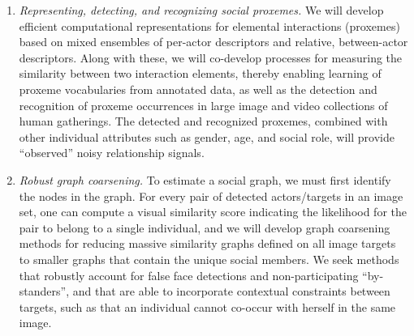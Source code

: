 \begin{enumerate}

\vspace{-0.1in}\item \emph{Representing, detecting, and recognizing social proxemes.} We will develop efficient computational representations for elemental interactions (proxemes) based on mixed ensembles of per-actor descriptors and relative, between-actor descriptors. Along with these, we will co-develop processes for measuring the similarity between two interaction elements, thereby enabling learning of proxeme vocabularies from annotated data, as well as the detection and recognition of proxeme occurrences in large image and video collections of human gatherings. The detected and recognized proxemes, combined with other individual attributes such as gender, age, and social role, will provide ``observed'' noisy relationship signals.

\vspace{-0.1in}\item \emph{Robust graph coarsening.} To estimate a social graph, we must first identify the nodes in the graph. For every pair of detected actors/targets in an image set, one can compute a visual similarity score indicating the likelihood for the pair to belong to a single individual, and we will develop graph coarsening methods for reducing massive similarity graphs defined on all image targets to smaller graphs that contain the unique social members. We seek methods that robustly account for false face detections and non-participating ``by-standers'', and that are able to incorporate contextual constraints between targets, such as that an individual cannot co-occur with herself in the same image. 



\end{enumerate}
